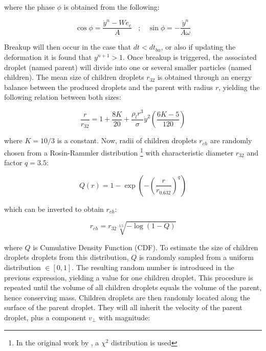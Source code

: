 where the phase $\phi$ is obtained from the following:

\begin{equation}
\cos \phi = \frac{\dot{y}^n - We_c}{A} ~~~~ ; ~~~~ \sin \phi = - \frac{\dot{y}^n}{A \omega}
\end{equation}

Breakup will then occur in the case that $dt < dt_{bu}$, or also if updating the deformation it is found that $y^{n+1} > 1$. Once breakup is triggered, the associated droplet (named parent) will divide into one or several smaller particles (named children). The mean size of children droplets $r_{32}$ is obtained through an energy balance between the produced droplets and the parent with radius $r$, yielding the following relation between both sizes:

\begin{equation}
\label{eq:TAB_model_radius_ratio}
\frac{r}{r_{32}} = 1 + \frac{8 K}{20} + \frac{\rho_l r^3}{\sigma} \dot{y}^2 \left( \frac{6 K - 5}{120} \right)
\end{equation}

where $K = 10/3$ is a constant. Now, radii of children droplets $r_{ch}$ are randomly chosen from a Rosin-Rammler distribution \footnote{In the original work by , a $\chi^2$ distribution is used} with characteristic diameter $r_{32}$ and factor $q = 3.5$: 


\begin{equation}
\label{eq:rossin_rammler_distribution}
Q \left( r \right) = 1 - \exp\left(  - \left( \frac{r}{r_{0.632}} \right)^q \right)
\end{equation}

which can be inverted to obtain $r_{ch}$:

\begin{equation}
r_{ch} = r_{32} \sqrt[3.5]{- \log \left( 1 - Q \right) }
\end{equation}

where $Q$ is Cumulative Density Function (CDF). To estimate the size of children droplets droplets from this distribution, $Q$ is randomly sampled from a uniform distribution $\in [0,1]$. The resulting random number is introduced in the previous expression, yielding a value for one children droplet. This procedure is repeated until the volume of all children droplets equals the volume of the parent, hence conserving mass. Children droplets are then randomly located along the surface of the parent droplet. They will all inherit the velocity of the parent droplet, plus a component $v_\perp$ with magnitude:

